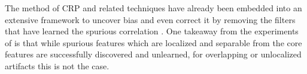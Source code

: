 

The method of CRP and related techniques have already been embedded into an extensive framework to uncover bias and even correct it by removing the filters that have learned the spurious correlation \citep{Pahde2023,Dreyer2023,Dreyer2023a}. One takeaway from the experiments of \cite{Dreyer2023a} is that while spurious features which are localized and separable from the core features are successfully discovered and unlearned, for overlapping or unlocalized artifacts this is not the case. 

